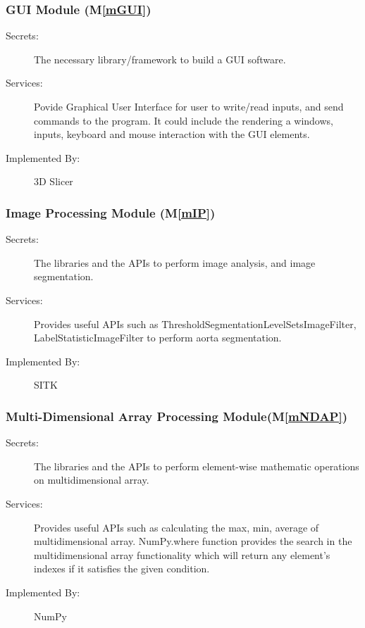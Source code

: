 \documentclass[12pt, titlepage]{article}
\newcommand{\mref}[1]{M\ref{#1}}
\begin{document}
\subsubsection{GUI Module (\mref{mGUI})}
\begin{description}
\item[Secrets:]The necessary library/framework to build a GUI software.
\item[Services:]Povide Graphical User Interface for user to write/read inputs, and send commands to the program. It could include the rendering a windows, inputs, keyboard and mouse interaction with the GUI elements.
\item[Implemented By:] 3D Slicer
\end{description}

\subsubsection{Image Processing Module (\mref{mIP})}
\begin{description}
\item[Secrets:] The libraries and the APIs to perform image analysis, and image segmentation.
\item[Services:] Provides useful APIs such as ThresholdSegmentationLevelSetsImageFilter, LabelStatisticImageFilter to perform aorta segmentation.
\item[Implemented By:] SITK
\end{description}

\subsubsection{Multi-Dimensional Array Processing Module(\mref{mNDAP})}
\begin{description}
\item[Secrets:] The libraries and the APIs to perform element-wise mathematic operations on multidimensional array.
\item[Services:] Provides useful APIs such as calculating the max, min, average of multidimensional array. NumPy.where function provides the search in the multidimensional array functionality which will return any element's indexes if it satisfies the given condition.
\item[Implemented By:] NumPy
\end{description}
\end{document}
